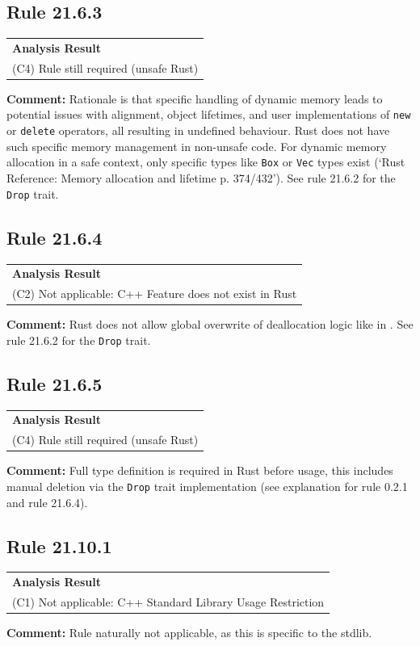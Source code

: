 \subsection*{Rule 21.6.3}
\begin{longtable}{p{13cm}}
\textbf{Analysis Result} \\
(C4) Rule still required (unsafe Rust) \\
\end{longtable}
\textbf{Comment:} Rationale is that specific handling of dynamic memory leads to potential issues with alignment, object lifetimes, and user implementations of \texttt{new} or \texttt{delete} operators, all resulting in undefined behaviour. Rust does not have such specific memory management in non-unsafe code. For dynamic memory allocation in a safe context, only specific types like \texttt{Box} or \texttt{Vec} types exist (`Rust Reference: Memory allocation and lifetime p. 374/432'). See rule 21.6.2 for the \texttt{Drop} trait. \\
\subsection*{Rule 21.6.4}
\begin{longtable}{p{13cm}}
\textbf{Analysis Result} \\
(C2) Not applicable: C++ Feature does not exist in Rust \\
\end{longtable}
\textbf{Comment:} Rust does not allow global overwrite of deallocation logic like in \Cpp. See rule 21.6.2 for the \texttt{Drop} trait. \\


\subsection*{Rule 21.6.5}
\begin{longtable}{p{13cm}}
\textbf{Analysis Result} \\
(C4) Rule still required (unsafe Rust) \\
\end{longtable}
\textbf{Comment:} Full type definition is required in Rust before usage, this includes manual deletion via the \texttt{Drop} trait implementation (see explanation for rule 0.2.1 and rule 21.6.4). \\
\subsection*{Rule 21.10.1}
\begin{longtable}{p{13cm}}
\textbf{Analysis Result} \\
(C1) Not applicable: C++ Standard Library Usage Restriction \\
\end{longtable}
\textbf{Comment:} Rule naturally not applicable, as this is specific to the \Cpp stdlib. \\
